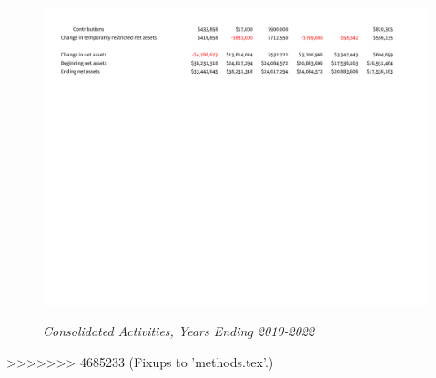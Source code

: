 \begin{figure}[hbt]
    \caption[Consolidated Activities, Years Ending 2010–2022]{\textit{Consolidated Activities, Years Ending 2010-2022}}\label{fig:consolidated_activities_2010-2022-2} %
    \includegraphics[width=\textwidth]{Consolidated_Financial_Statements/v5_Spreadsheets/Consolidated_Activities_Years_2010-2022_PDF_pages/.pg_0002}\\ %
\end{figure}
>>>>>>> 4685233 (Fixups to 'methods.tex'.)

